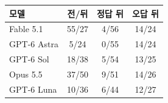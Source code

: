 \setlength{\tabcolsep}{2.4pt}
\small
\begin{tabular}{@{}lccc@{}}
\toprule
모델 & 전/뒤 & 정답 뒤 & 오답 뒤 \\
\midrule
Fable 5.1 & 55/27 & 4/56 & 14/24 \\
GPT-6 Astra & 5/24 & 0/55 & 14/24 \\
GPT-6 Sol & 18/38 & 5/54 & 13/25 \\
Opus 5.5 & 37/50 & 9/51 & 14/26 \\
GPT-6 Luna & 10/36 & 6/44 & 12/27 \\
\bottomrule
\end{tabular}
